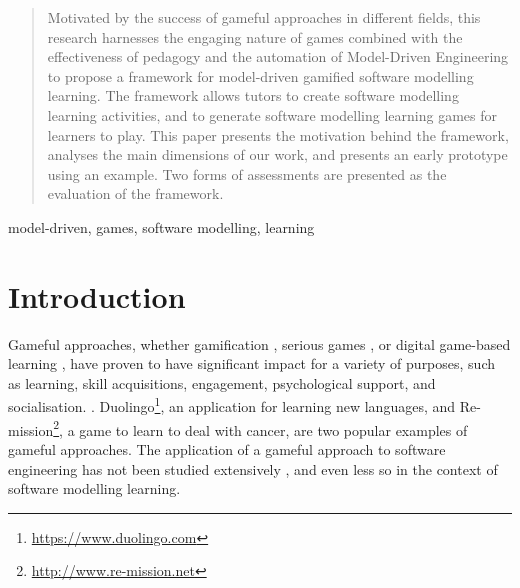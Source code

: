 \documentclass[conference]{IEEEtran}
\begin{document}
\maketitle

\begin{abstract}
\label{abstract}
Motivated by the success of gameful approaches in different fields, this research harnesses the engaging nature of games combined with the effectiveness of pedagogy and the automation of Model-Driven Engineering to propose a framework for model-driven gamified software modelling learning. The framework allows tutors to create software modelling learning activities, and to generate software modelling learning games for learners to play. This paper presents the motivation behind the framework, analyses the main dimensions of our work, and presents an early prototype using an example. Two forms of assessments are presented as the evaluation of the framework.
\end{abstract}

\begin{IEEEkeywords} 
model-driven, games, software modelling, learning
\end{IEEEkeywords}



%
\IEEEpeerreviewmaketitle

\section{Introduction}
Gameful approaches, whether gamification \cite{stieglitz2016gamification}, serious games \cite{dorner2016serious}, or digital game-based learning \cite{san2015games}, have proven to have significant impact for a variety of purposes, such as learning, skill acquisitions, engagement, psychological support, and socialisation. \cite{connolly2012systematic, hamari2014does}. Duolingo\footnote{\url{https://www.duolingo.com}}, an application for learning new languages, and Re-mission\footnote{\url{http://www.re-mission.net}}, a game to learn to deal with cancer, are two popular examples of gameful approaches. The application of a gameful approach to software engineering has not been studied extensively \cite{Pedreira2015}, and even less so in the context of software modelling learning. 
\end{document}
